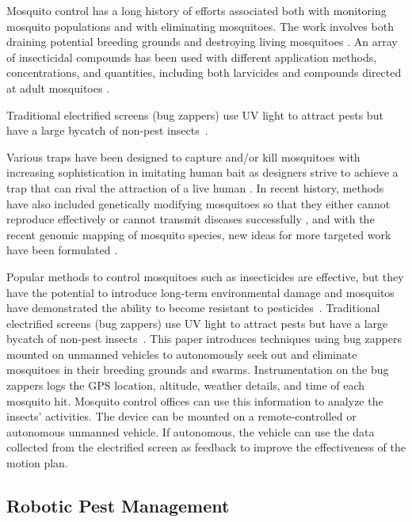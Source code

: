 \documentclass[letterpaper, 10 pt, conference]{ieeeconf}  %
\begin{document}
	Mosquito control has a long history of efforts associated both with monitoring mosquito populations \cite{dennett2007associations} and with eliminating mosquitoes.  The work involves both draining potential breeding grounds and destroying living mosquitoes \cite{peter2005tick}.  An array of insecticidal compounds has been used with different application methods, concentrations, and quantities, including both larvicides and compounds directed at adult mosquitoes \cite{larvicides2005guidelines}.
	
Traditional electrified screens (bug zappers) use UV light to attract pests but have a large bycatch of non-pest insects~\cite{University-Of-Florida1997}. 

	Various traps have been designed to capture and/or kill mosquitoes with increasing sophistication in imitating human bait as designers strive to achieve a trap that can rival the attraction of a live human \cite{maliti2015development}.  In recent history, methods have also included genetically modifying mosquitoes so that they either cannot reproduce effectively or cannot transmit diseases successfully \cite{marshall2009malaria}, and with the recent genomic mapping of mosquito species, new ideas for more targeted work have been formulated \cite{hill2005arthropod}.
	
	Popular methods to control mosquitoes such as insecticides are effective, but they have the potential to introduce long-term environmental damage and mosquitos have demonstrated the ability to become resistant to pesticides~\cite{ndiath2012resistance}. Traditional electrified screens (bug zappers) use UV light to attract pests but have a large bycatch of non-pest insects~\cite{University-Of-Florida1997}. This paper introduces techniques using bug zappers mounted on unmanned vehicles to autonomously seek out and eliminate mosquitoes in their breeding grounds and swarms. Instrumentation on the bug zappers logs the GPS location, altitude, weather details, and time of each mosquito hit.  Mosquito control offices can use this information to analyze the insects' activities. The device can be mounted on a remote-controlled or autonomous unmanned vehicle. If autonomous, the vehicle can use the data collected from the electrified screen as feedback to improve the effectiveness of the motion plan. 
	
 
    \subsection{Robotic Pest Management}
    
\end{document}
